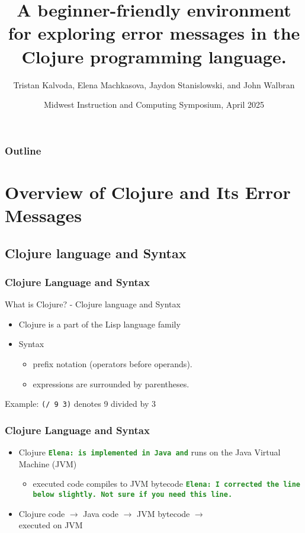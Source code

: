 \documentclass{beamer}
\newcommand{\comment}[1]{{\bf \tt  {#1}}}
\newcommand{\emcomment}[1]{\textcolor{ForestGreen}{\comment{Elena: {#1}}}}
\begin{document}
\title{A beginner-friendly environment for exploring error messages in the Clojure programming language.}
\author{Tristan Kalvoda, Elena Machkasova, Jaydon Stanislowski, and John Walbran}
\date[]  
{Midwest Instruction and Computing Symposium, April 2025}

\begin{frame}
  \titlepage
\end{frame}

\begin{frame}

  \frametitle{Outline}
\tableofcontents
\end{frame}

\section{Overview of Clojure and Its Error Messages}

\subsection{Clojure language and Syntax}
\begin{frame}
\frametitle{Clojure Language and Syntax}
What is Clojure? - Clojure language and Syntax
\begin{itemize}
  \item Clojure is a part of the Lisp language family
  \item Syntax
  \begin{itemize}
    \item prefix notation (operators before operands).
    \item expressions are surrounded by parentheses.
  \end{itemize}
\end{itemize}
Example: \texttt{(/ 9 3)} denotes 9 divided by 3
\end{frame}

\begin{frame}
  \frametitle{Clojure Language and Syntax}
  \begin{itemize}
    \item Clojure \emcomment{is implemented in Java and} runs on the Java Virtual Machine (JVM)
    \begin{itemize}
      \item executed code compiles to JVM bytecode \emcomment{I corrected the line below slightly. Not sure if you need this line.}
    \end{itemize}
    \item Clojure code \(\rightarrow\) Java code \(\rightarrow\) JVM bytecode \(\rightarrow\) \\ executed on JVM
  \end{itemize}
\end{frame}
\end{document}
